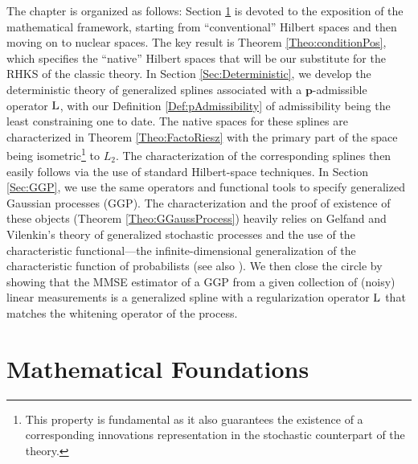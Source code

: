 \documentclass[11pt, english,english]{article}
\newcommand{\Lop}{{\rm L}}
\def\V#1{{\boldsymbol{#1}}}         %
\renewcommand{\[}{\begin{equation}}
\renewcommand{\]}[1]{\label{eq:#1}\end{equation}}
\begin{document}
\begin{itemize}
\end{itemize}
The chapter is organized as follows: Section \ref{Sec:Foundations} is devoted to the exposition of the mathematical framework, starting from ``conventional'' Hilbert spaces and then moving on to nuclear spaces. The key result
is Theorem \ref{Theo:conditionPos}, which specifies the ``native'' Hilbert spaces that will be our substitute for the RHKS of the classic theory. In Section \ref{Sec:Deterministic}, we develop the deterministic theory of generalized splines associated with a ${\V p}$-admissible operator $\Lop$, with our Definition \ref{Def:pAdmissibility} of admissibility being the least constraining one to date. The native spaces for these splines are characterized in Theorem \ref{Theo:FactoRiesz} with the primary part of the space being isometric\footnote{This property is fundamental as it also guarantees the existence of a corresponding innovations representation in the stochastic counterpart of the theory.} to $L_2$.  The characterization of the corresponding splines then easily follows via the use of standard Hilbert-space techniques.
In Section \ref{Sec:GGP}, we use the same operators and functional tools to specify generalized Gaussian processes (GGP).
The characterization and the proof of existence of these objects (Theorem \ref{Theo:GGaussProcess}) heavily relies on Gelfand and Vilenkin's theory of generalized stochastic processes
\cite{Gelfand-Villenkin1964} and the use of the characteristic functional---the infinite-dimensional generalization of the characteristic function of probabilists (see also \cite{Unser2014book}).
We then close the circle by showing that the MMSE estimator of a GGP from a given collection of (noisy) linear measurements is a generalized spline with a regularization operator $\Lop$ that matches the whitening operator of the process.
\section{Mathematical Foundations}
\label{Sec:Foundations}
\end{document}
